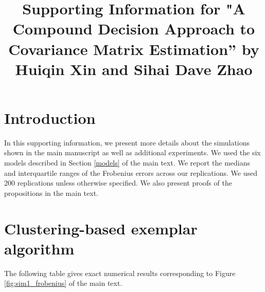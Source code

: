 \documentclass{article}
\title{Supporting Information for "A Compound Decision Approach to Covariance Matrix Estimation'' by Huiqin Xin and Sihai Dave Zhao}
\date{}
\begin{document}
\maketitle


\section{Introduction} 
In this supporting information, we present more details about the simulations shown in the main manuscript as well as additional experiments. We used the six models described in Section \ref{models} of the main text. We report the medians and interquartile ranges of the Frobenius errors across our replications. We used 200 replications unless otherwise specified. We also present proofs of the propositions in the main text.

\section{Clustering-based exemplar algorithm}

The following table gives exact numerical results corresponding to Figure \ref{fig:sim1_frobenius} of the main text.
\end{document}
